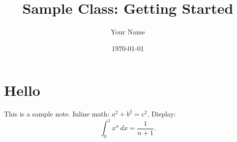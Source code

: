 \documentclass{article}
\title{Sample Class: Getting Started}
\author{Your Name}
\date{\today}
\begin{document}
\maketitle

\section*{Hello}
This is a sample note. Inline math: $a^2+b^2=c^2$. Display:
\[\int_0^1 x^n \, dx = \frac{1}{n+1}.\]
\end{document}
